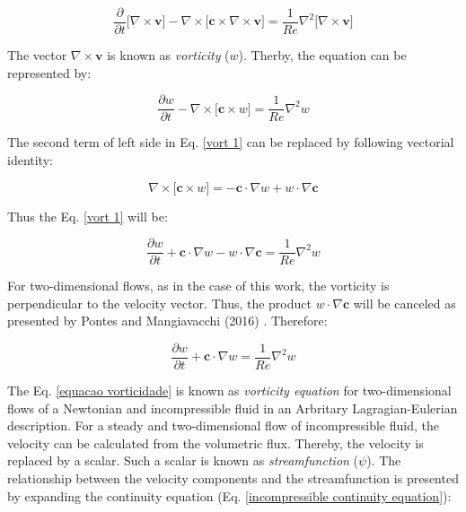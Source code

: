 \begin{equation}
 \frac{\partial}{\partial t} \big[ \nabla \times \textbf{v} \big]
 - 
 \nabla \times \big[ \textbf{c} \times \nabla \times \textbf{v} \big]
 =
 \frac{1}{Re} \nabla^{2} \big[ \nabla \times \textbf{v} \big]
\end{equation}

\medskip
\noindent
The vector $\nabla \times \textbf{v}$ is known as
\textit{vorticity} ($w$).
Therby, the equation can be represented by:

\begin{equation} \label{vort 1}
 \frac{\partial w}{\partial t}
 - 
 \nabla \times \big[ \textbf{c} \times w \big]
 =
 \frac{1}{Re} \nabla^{2} w
\end{equation}

\medskip
\noindent
The second term of left side in 
Eq. \ref{vort 1}
can be replaced by following vectorial identity:


\begin{equation}
 \nabla \times \big[ \textbf{c} \times w \big]
 =
 -
 \textbf{c} \cdot \nabla w
 +
 w \cdot \nabla \textbf{c}
\end{equation}

\medskip
\noindent
Thus the Eq. \ref{vort 1} will be:

\begin{equation} \label{vort 2}
 \frac{\partial w}{\partial t}
 +
 \textbf{c} \cdot \nabla w
 - 
 w \cdot \nabla \textbf{c}
 =
 \frac{1}{Re} \nabla^{2} w
\end{equation}

\medskip
For two-dimensional flows, as in the case of this work,
 the vorticity is perpendicular to the velocity vector.
 Thus, the product $w \cdot \nabla \textbf{c}$ will be canceled
 as presented by Pontes and Mangiavacchi (2016) \cite{pontes2016}.
 Therefore:

\begin{equation} \label{equacao vorticidade}
 \frac{\partial w}{\partial t}
 +
 \textbf{c} \cdot \nabla w
 =
 \frac{1}{Re} \nabla^{2} w
\end{equation}

\medskip
The Eq. \ref{equacao vorticidade} is known as
 \textit{vorticity equation} for two-dimensional flows of
 a Newtonian and incompressible fluid in an Arbritary
 Lagragian-Eulerian description. For a steady and 
 two-dimensional flow of incompressible fluid,
 the velocity can be calculated from the volumetric flux.
 Thereby, the velocity is replaced by a scalar.
 Such a scalar is known as \textit{streamfunction} ($\psi$).
 The relationship between the velocity components and
 the streamfunction is presented by expanding the
 continuity equation (Eq. \ref{incompressible continuity equation}):

